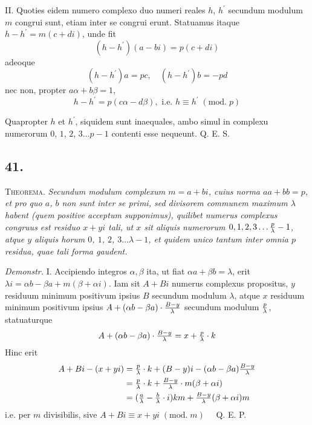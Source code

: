 \documentclass[twoside,12pt, showframe]{memoir}
\renewcommand{\pmod}[1]{\;(\textrm{mod.}\;#1)}
\let\oldfrac\frac
\def\frac#1#2{\mathchoice{\tfrac{#1}{#2}}{\oldfrac{#1}{#2}}{\genfrac{}{}{}{2}{#1}{#2\mathstrut}}{\genfrac{}{}{}{3}{#1}{#2\mathstrut}}}
\begin{document}
II. Quoties eidem numero complexo duo numeri reales \(h\), \(h^{\prime}\) secundum modulum \(m\) congrui sunt, etiam inter se congrui erunt. Statuamus itaque \(h-h^{\prime}=m(c+d i)\), unde fit
\[(h-h^{\prime})(a-b i)=p(c+d i)\]
adeoque
\[(h-h^{\prime}) a=p c, \quad (h-h^{\prime}) b=-p d\]
nec non, propter \(a \alpha+b \beta=1\),
\[h-h^{\prime}=p(c \alpha-d \beta), \text{ i.e. } h \equiv h^{\prime}\pmod{p}\]
 
Quapropter \(h\) et \(h^{\prime}\), siquidem sunt inaequales, ambo simul in complexu numerorum \(0\), \(1\), \(2\), \(3 \ldots p-1\) contenti esse nequeunt. Q. E. S.

\subsection*{41.}
 
\textsc{Theorema.}\textit{ Secundum modulum complexum \(m=a+b i\), cuius norma \(a a+b b=p\), et pro quo \(a\), \(b\) non sunt inter se primi, sed divisorem communem maximum \(\lambda\) habent (quem positive acceptum supponimus), quilibet numerus complexus congruus est residuo \(x+y i\) tali, ut \(x\) sit aliquis numerorum \(0,1,2,3 \ldots \frac{p}{\lambda}-1\), atque \(y\) aliquis horum \(0\), \(1\), \(2\), \(3 \ldots \lambda-1\), et quidem unico tantum inter omnia \(p\) residua, quae tali forma gaudent.}\clearpage\noindent%
 
\textit{Demonstr.} I. Accipiendo integros \(\alpha, \beta\) ita, ut fiat \(\alpha a+\beta b=\lambda\), erit \(\lambda i=\alpha b-\beta a+m(\beta+\alpha i)\). Iam sit \(A+B i\) numerus complexus propositus, \(y\) residuum minimum positivum ipsius \(B\) secundum modulum \(\lambda\), atque \(x\) residuum minimum positivum ipsius \(A+(\alpha b-\beta a) \cdot \frac{B-y}{\lambda}\) secundum modulum \(\frac{p}{\lambda}\), statuaturque
\[A+(\alpha b-\beta a) \cdot \frac{B-y}{\lambda}=x+\frac{p}{\lambda} \cdot k\]
Hinc erit
\[\begin{aligned}
A+B i-(x+y i) & =\frac{p}{\lambda} \cdot k+(B-y) i-(\alpha b-\beta a) \frac{B-y}{\lambda} \\
& =\frac{p}{\lambda} \cdot k+\frac{B-y}{\lambda} \cdot m(\beta+\alpha i) \\
& =(\frac{a}{\lambda}-\frac{b}{\lambda} \cdot i) k m+\frac{B-y}{\lambda}(\beta+\alpha i) m
\end{aligned}\]
i.e. per \(m\) divisibilis, sive \(A+B i \equiv x+y i\pmod{m} \quad\) Q. E. P.
 
\end{document}

